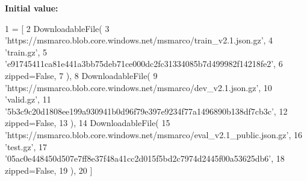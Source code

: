 {\bfseries Initial value\+:}
\begin{DoxyCode}
1 =  [
2     DownloadableFile(
3         \textcolor{stringliteral}{'https://msmarco.blob.core.windows.net/msmarco/train\_v2.1.json.gz'},
4         \textcolor{stringliteral}{'train.gz'},
5         \textcolor{stringliteral}{'e91745411ca81e441a3bb75deb71ce000dc2fc31334085b7d499982f14218fe2'},
6         zipped=\textcolor{keyword}{False},
7     ),
8     DownloadableFile(
9         \textcolor{stringliteral}{'https://msmarco.blob.core.windows.net/msmarco/dev\_v2.1.json.gz'},
10         \textcolor{stringliteral}{'valid.gz'},
11         \textcolor{stringliteral}{'5b3c9c20d1808ee199a930941b0d96f79e397e9234f77a1496890b138df7cb3c'},
12         zipped=\textcolor{keyword}{False},
13     ),
14     DownloadableFile(
15         \textcolor{stringliteral}{'https://msmarco.blob.core.windows.net/msmarco/eval\_v2.1\_public.json.gz'},
16         \textcolor{stringliteral}{'test.gz'},
17         \textcolor{stringliteral}{'05ac0e448450d507e7ff8e37f48a41cc2d015f5bd2c7974d2445f00a53625db6'},
18         zipped=\textcolor{keyword}{False},
19     ),
20 ]
\end{DoxyCode}
